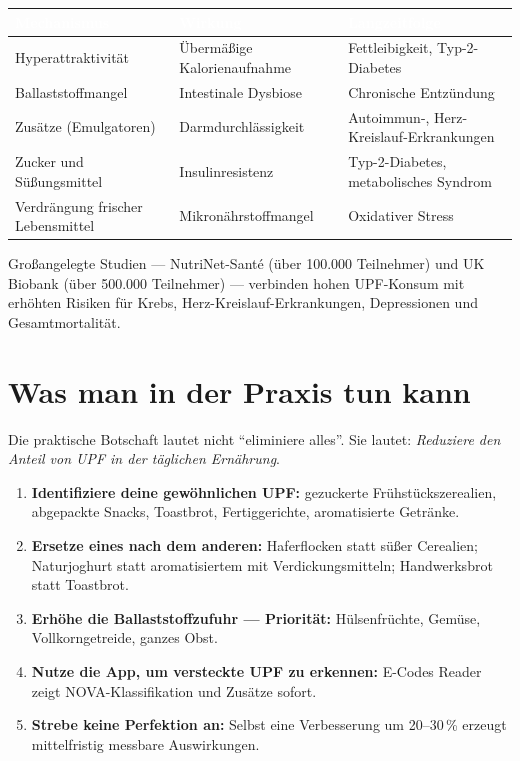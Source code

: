 \documentclass[a5paper,12pt,oneside,openany]{book}
\begin{document}
{\small
\begin{tabularx}{\textwidth}{|l|L|L|}
\hline
{}
  \textcolor{white}{\textbf{Mechanismus}}
  & \textcolor{white}{\textbf{Wirkung}}
  & \textcolor{white}{\textbf{Langzeitfolge}} \\
\hline
Hyperattraktivit\"{a}t & \"{U}berm\"{a}{\ss}ige Kalorienaufnahme & Fettleibigkeit, Typ-2-Diabetes \\
\hline
Ballaststoffmangel & Intestinale Dysbiose & Chronische Entz\"{u}ndung \\
\hline
Zus\"{a}tze (Emulgatoren) & Darmdurchl\"{a}ssigkeit & Autoimmun-, Herz-Kreislauf-Erkrankungen \\
\hline
Zucker und S\"{u}{\ss}ungsmittel & Insulinresistenz & Typ-2-Diabetes, metabolisches Syndrom \\
\hline
Verdr\"{a}ngung frischer Lebensmittel & Mikron\"{a}hrstoffmangel & Oxidativer Stress \\
\hline
\end{tabularx}
}

Gro{\ss}angelegte Studien --- NutriNet-Sant\'{e} (\"{u}ber 100.000 Teilnehmer)
und UK Biobank (\"{u}ber 500.000 Teilnehmer) --- verbinden hohen UPF-Konsum
mit erh\"{o}hten Risiken f\"{u}r Krebs, Herz-Kreislauf-Erkrankungen,
Depressionen und Gesamtmortalit\"{a}t.

\section{Was man in der Praxis tun kann}

Die praktische Botschaft lautet nicht ``eliminiere alles''. Sie lautet:
\emph{Reduziere den Anteil von UPF in der t\"{a}glichen Ern\"{a}hrung}.

\begin{enumerate}
  \item \textbf{Identifiziere deine gew\"{o}hnlichen UPF:} gezuckerte
    Fr\"{u}hst\"{u}ckszerealien, abgepackte Snacks, Toastbrot, Fertiggerichte,
    aromatisierte Getr\"{a}nke.
  \item \textbf{Ersetze eines nach dem anderen:} Haferflocken statt
    s\"{u}{\ss}er Cerealien; Naturjoghurt statt aromatisiertem mit
    Verdickungsmitteln; Handwerksbrot statt Toastbrot.
  \item \textbf{Erh\"{o}he die Ballaststoffzufuhr --- Priorit\"{a}t:}
    H\"{u}lsenfr\"{u}chte, Gem\"{u}se, Vollkorngetreide, ganzes Obst.
  \item \textbf{Nutze die App, um versteckte UPF zu erkennen:}
    E-Codes Reader zeigt NOVA-Klassifikation und Zus\"{a}tze sofort.
  \item \textbf{Strebe keine Perfektion an:} Selbst eine Verbesserung um
    20--30\,\% erzeugt mittelfristig messbare Auswirkungen.
\end{enumerate}
\end{document}
